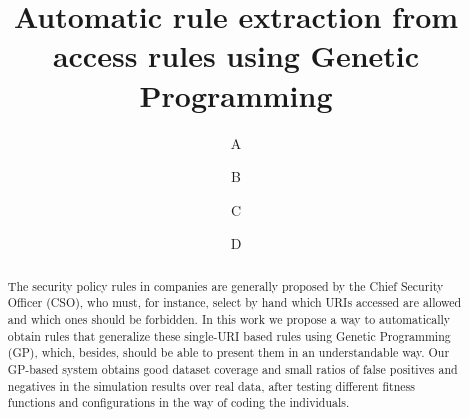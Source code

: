 \documentclass[runningheads]{llncs}
\begin{document}
%
\title{Automatic rule extraction from access rules using Genetic Programming}

 \author{A
 \and
 B
 \and
 C
 \and
 D
}


%
%
%
%
%
\maketitle              %
%
\begin{abstract}
The security policy rules in companies are generally proposed by the
Chief Security Officer (CSO), who must, for instance, select by hand
which URIs accessed are allowed and which ones should be forbidden. In
this work we propose a way to automatically obtain rules that
generalize these single-URI based rules using Genetic Programming
(GP), which, besides, should be able to present them in an
understandable way. Our GP-based system obtains good dataset coverage
and small ratios of false positives and negatives in the simulation
results over real data, after testing different fitness functions and
configurations in the way of coding the individuals.

\end{abstract}
%
%
%
\end{document}
